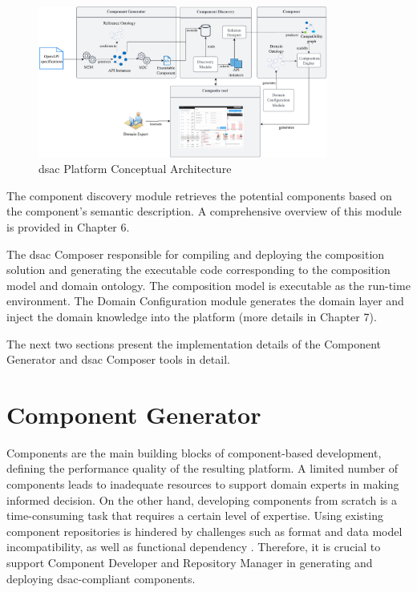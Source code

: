 \begin{figure}[hbt]
\hypertarget{fig:reference-architecture}{%
\centering
\includegraphics[width=0.85\textwidth]{../figures/MyFigures/ReferenceArch.drawio.pdf}
\captionsetup{justification=centering}
\caption{\gls{dsac} Platform Conceptual Architecture}\label{fig:reference-architecture}
}
\end{figure}
The component discovery module retrieves the potential components based on the component’s semantic description. A comprehensive overview of this module is provided in Chapter 6. 

The \gls{dsac} Composer responsible for compiling and deploying the composition solution and generating the executable code corresponding to the composition model and domain ontology. The composition model is executable as the run-time environment. The Domain Configuration module generates the domain layer and inject the domain knowledge into the platform (more details in Chapter 7).

The next two sections present the implementation details of the Component Generator and \gls{dsac} Composer tools in detail.

\hypertarget{sec:component-gen}{%
\section{Component Generator}\label{sec:component-gen}}
\vspace{15pt}

Components are the main building blocks of component-based development, defining the performance quality of the resulting platform. A limited number of components leads to inadequate resources to support domain experts in making informed decision. On the other hand, developing components from scratch is a time-consuming task that requires a certain level of expertise. Using existing component repositories is hindered by challenges such as format and data model incompatibility, as well as functional dependency \autocite{Tschudnowsky2016}. Therefore, it is crucial to support Component Developer and Repository Manager in generating and deploying \gls{dsac}-compliant components. 

